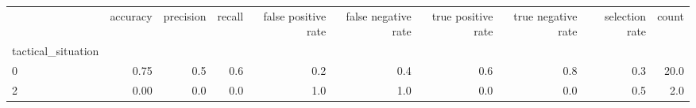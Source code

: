 \begin{tabular}{lrrrrrrrrr}
\toprule
{} &  accuracy &  precision &  recall &  false positive rate &  false negative rate &  true positive rate &  true negative rate &  selection rate &  count \\
tactical\_situation &           &            &         &                      &                      &                     &                     &                 &        \\
\midrule
0                  &      0.75 &        0.5 &     0.6 &                  0.2 &                  0.4 &                 0.6 &                 0.8 &             0.3 &   20.0 \\
2                  &      0.00 &        0.0 &     0.0 &                  1.0 &                  1.0 &                 0.0 &                 0.0 &             0.5 &    2.0 \\
\bottomrule
\end{tabular}
